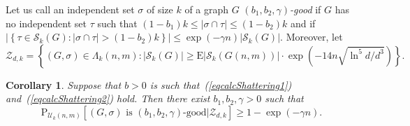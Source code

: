 \documentclass[a4paper,10pt]{article}
\newtheorem{corollary}{Corollary}\renewcommand{\thecorollary}{\arabic{corollary}}
\newcommand\cU{\mathcal{U}}
\newcommand\cS{\mathcal{S}}
\newcommand\cZ{\mathcal{Z}}
\newcommand\Erw{\mathrm{E}}
\newcommand\pr{\mathrm{P}}
\newcommand\bc[1]{\left({#1}\right)}
\newcommand\cbc[1]{\left\{{#1}\right\}}
\newcommand\brk[1]{\left\lbrack{#1}\right\rbrack}
\newcommand\abs[1]{\left|{#1}\right|}
\begin{document}
Let us call an independent set $\sigma$ of size $k$ of a graph $G$
\emph{$(b_1,b_2,\gamma)$-good} if $G$ has no independent set $\tau$
such that $(1-b_1)k\leq|\sigma\cap \tau|\leq(1-b_2)k$ and if
		$\abs{\cbc{\tau\in\cS_k(G):|\sigma\cap\tau|>(1-b_2)k}}\leq\exp(-\gamma n)|\cS_k(G)|$.
Moreover, let
	\begin{equation}\label{eqeventZdk}
	\cZ_{d,k}=\cbc{(G,\sigma)\in\Lambda_k(n,m):|\cS_k(G)|\geq\Erw|\cS_k(G(n,m))|\cdot\exp\bc{-14n\sqrt{\ln^5d/d^3}}}.
	\end{equation}

\begin{corollary}\label{Cor_condexp}
Suppose that $b>0$ is such that~(\ref{eqcalcShattering1}) and~(\ref{eqcalcShattering2}) hold.
Then there exist $b_1,b_2,\gamma>0$ such that
	$$\pr_{\cU_k(n,m)}\brk{(G,\sigma)\mbox{ is $(b_1,b_2,\gamma)$-good}|\cZ_{d,k}}\geq1-\exp(-\gamma n).$$
\end{corollary}
\end{document}
